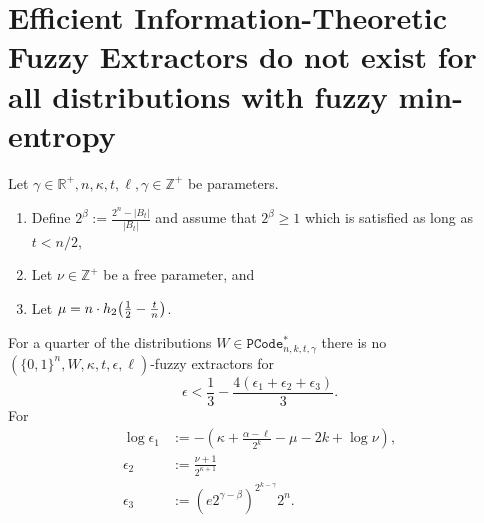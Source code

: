 

\section{Efficient Information-Theoretic Fuzzy Extractors do not exist for all distributions with fuzzy min-entropy}
\label{sec:fe}

\begin{theorem}
Let $\gamma \in\mathbb{R}^+, n, \kappa, t, \ell, \gamma \in\mathbb{Z}^+$ be parameters. 
\begin{enumerate}
\itemsep0em
\item Define $2^\beta:=\frac{2^n-|B_t|}{|B_t|}$ and assume that $2^\beta\ge 1$ which is  satisfied as long as $t< n/2 $,
\item Let $\nu \in \mathbb{Z}^+$ be a free parameter, and
\item Let $\mu =  n \cdot h_2\!\left(\frac{1}{2} - \frac{t}{n}\right)$.
\end{enumerate}
For a quarter of the distributions $W\in \mathtt{PCode}_{n, k, t, \gamma}^{*}$ there is no $(\{0,1\}^n, W, \kappa, t, \epsilon, \ell)$-fuzzy extractors for 
\[
\epsilon< \frac{1}{3} - \frac{4(\epsilon_1+\epsilon_2+\epsilon_3)}{3}.
\]
For 
\begin{align*}\log{\epsilon_1}&:= -\left(\kappa+\frac{\alpha -\ell}{2^k} - \mu -2k+\log{\nu}\right),\\
\epsilon_2&:=\frac{\nu+1}{2^{\kappa+1}}\\
\epsilon_3&:=\left(e2^{\gamma-\beta}\right)^{2^{k-\gamma}}2^n.
\end{align*}
\label{thm:main theorem}
\end{theorem}

